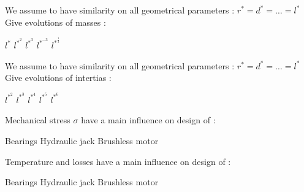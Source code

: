 \documentclass{webquiz}
\begin{document}
   \begin{question} 
     We assume to have similarity on all geometrical parameters :  $r^* = d^* = …=  l^*$ \\
    \newline
	Give evolutions of masses : 
     \begin{choice}
      \incorrect  $ l^*$
      \incorrect  $ l^{*^2}$ 
      \incorrect  $ l^{*^3}$ 
      \incorrect $ l^{*^{-3}}$ 
      \correct  $ l^{*^{\frac{1}{3}}}$ 
     \end{choice} 
   \end{question}
     \begin{question} 
   We assume to have similarity on all geometrical parameters :  $r^* = d^* = …=  l^*$ \\
    \newline
	Give evolutions of intertias : 
     \begin{choice}
      \incorrect  $ l^{*^2}$ 
      \incorrect  $ l^{*^3}$ 
         \incorrect  $ l^{*^4}$
      \incorrect $ l^{*^{5}}$ 
      \correct  $ l^{*^6}$ 
     \end{choice} 
   \end{question}
   
   \begin{question} 
 Mechanical stress $\sigma$ have a main influence on design of : \\
     \begin{choice}
      \incorrect  Bearings
      \incorrect  Hydraulic jack
         \correct  Brushless motor
     \end{choice} 
   \end{question}
   
    \begin{question} 
Temperature \theta and losses have a main influence on design of : \\
     \begin{choice}
      \incorrect  Bearings
      \correct  Hydraulic jack
         \incorrect  Brushless motor
     \end{choice} 
   \end{question}
   
  
     
\end{document}
